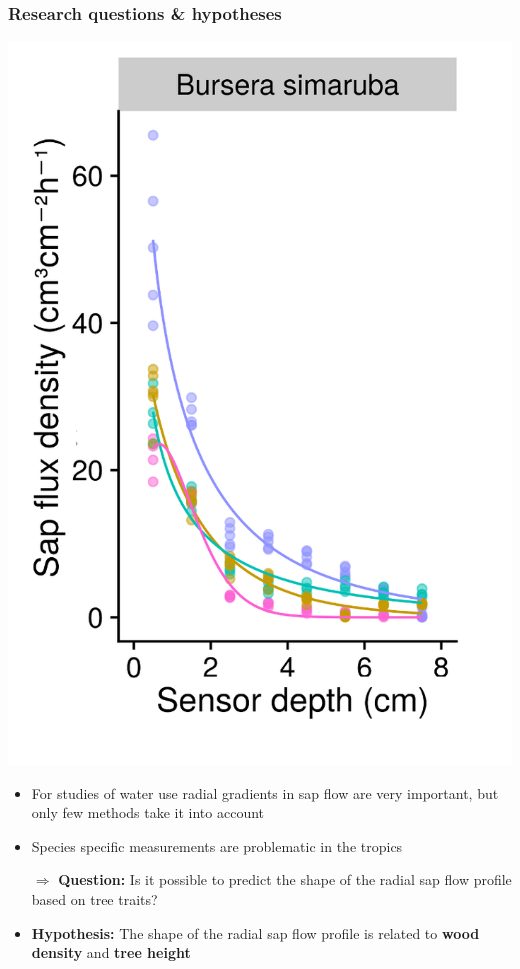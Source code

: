 \documentclass[usepdftitle=false]{beamer}
\newcommand{\Blue}[1]{{\color{blue!50!black}\textbf{#1}}}
\newcommand{\Rar}{$\Rightarrow$}
\newcommand{\tw}{\textwidth}
\begin{document}
\begin{frame}
	\frametitle{Research questions \& hypotheses}
	\begin{minipage}{0.38\tw}
		\includegraphics[width = \tw]{figures/HFD_05_profile_simarouba.png}
	\end{minipage}
	\begin{minipage}{0.6\tw}
			\begin{itemize}[<+-| alert@+>]
			\item For studies of water use radial gradients in sap flow are very important, but only few methods take it into account	
			\item Species specific measurements are problematic in the tropics		
			\item[\Rar] \Blue{Question:} Is it possible to predict the shape of the radial sap flow profile based on tree traits?
			\item<visible@+| alert@+>[\Rar] \Blue{Hypothesis:} The shape of the radial sap flow profile is related to \textbf{wood density} and \textbf{tree height}
		\end{itemize}						
	\end{minipage}
\end{frame}
\end{document}
